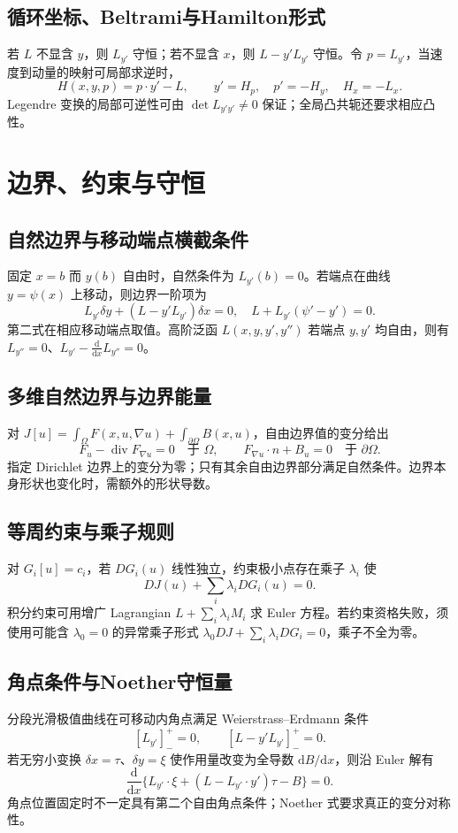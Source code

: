 \documentclass[../main.tex]{subfiles}
\begin{document}
\subsection{循环坐标、Beltrami与Hamilton形式}
若 $L$ 不显含 $y$，则 $L_{y'}$ 守恒；若不显含 $x$，则 $L-y'L_{y'}$ 守恒。令 $p=L_{y'}$，当速度到动量的映射可局部求逆时，
\[
H(x,y,p)=p\cdot y'-L,\qquad y'=H_p,\quad p'=-H_y,\quad H_x=-L_x.
\]
Legendre 变换的局部可逆性可由 $\det L_{y'y'}\ne0$ 保证；全局凸共轭还要求相应凸性。
\section{边界、约束与守恒}
\subsection{自然边界与移动端点横截条件}
固定 $x=b$ 而 $y(b)$ 自由时，自然条件为 $L_{y'}(b)=0$。若端点在曲线 $y=\psi(x)$ 上移动，则边界一阶项为
\[
L_{y'}\delta y+(L-y'L_{y'})\delta x=0,
\quad L+L_{y'}(\psi'-y')=0.
\]
第二式在相应移动端点取值。高阶泛函 $L(x,y,y',y'')$ 若端点 $y,y'$ 均自由，则有 $L_{y''}=0$、$L_{y'}-\frac{\mathrm d}{\mathrm dx}L_{y''}=0$。
\subsection{多维自然边界与边界能量}
对 $J[u]=\int_\Omega F(x,u,\nabla u)+\int_{\partial\Omega}B(x,u)$，自由边界值的变分给出
\[
F_u-\operatorname{div}F_{\nabla u}=0\quad\text{于 }\Omega,\qquad
F_{\nabla u}\cdot n+B_u=0\quad\text{于 }\partial\Omega.
\]
指定 Dirichlet 边界上的变分为零；只有其余自由边界部分满足自然条件。边界本身形状也变化时，需额外的形状导数。
\subsection{等周约束与乘子规则}
对 $G_i[u]=c_i$，若 $DG_i(u)$ 线性独立，约束极小点存在乘子 $\lambda_i$ 使
\[
DJ(u)+\sum_i\lambda_iDG_i(u)=0.
\]
积分约束可用增广 Lagrangian $L+\sum_i\lambda_iM_i$ 求 Euler 方程。若约束资格失败，须使用可能含 $\lambda_0=0$ 的异常乘子形式 $\lambda_0DJ+\sum_i\lambda_iDG_i=0$，乘子不全为零。
\subsection{角点条件与Noether守恒量}
分段光滑极值曲线在可移动内角点满足 Weierstrass--Erdmann 条件
\[
[L_{y'}]_-^+=0,\qquad[L-y'L_{y'}]_-^+=0.
\]
若无穷小变换 $\delta x=\tau$、$\delta y=\xi$ 使作用量改变为全导数 $\mathrm dB/\mathrm dx$，则沿 Euler 解有
\[
\frac{\mathrm d}{\mathrm dx}\{L_{y'}\cdot\xi+(L-L_{y'}\cdot y')\tau-B\}=0.
\]
角点位置固定时不一定具有第二个自由角点条件；Noether 式要求真正的变分对称性。
\end{document}
